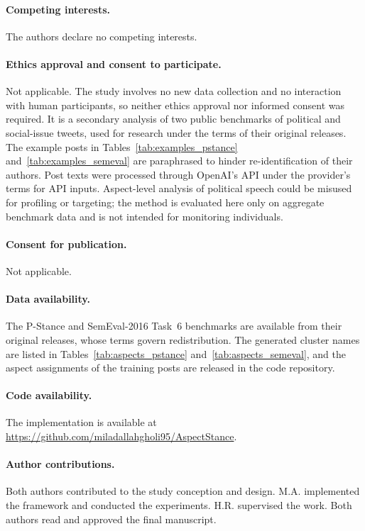 \documentclass[pdflatex,sn-mathphys-num,iicol]{sn-jnl}%
\begin{document}
\paragraph{Competing interests.} The authors declare no competing interests.

\paragraph{Ethics approval and consent to participate.} Not applicable. The study involves no new data collection and no interaction with human participants, so neither ethics approval nor informed consent was required. It is a secondary analysis of two public benchmarks of political and social-issue tweets, used for research under the terms of their original releases. The example posts in Tables~\ref{tab:examples_pstance} and~\ref{tab:examples_semeval} are paraphrased to hinder re-identification of their authors. Post texts were processed through OpenAI's API under the provider's terms for API inputs. Aspect-level analysis of political speech could be misused for profiling or targeting; the method is evaluated here only on aggregate benchmark data and is not intended for monitoring individuals.

\paragraph{Consent for publication.} Not applicable.

\paragraph{Data availability.} The P-Stance \cite{li2021p} and SemEval-2016 Task~6 \cite{mohammad2016semeval} benchmarks are available from their original releases, whose terms govern redistribution. The generated cluster names are listed in Tables~\ref{tab:aspects_pstance} and~\ref{tab:aspects_semeval}, and the aspect assignments of the training posts are released in the code repository.

\paragraph{Code availability.} The implementation is available at \url{https://github.com/miladallahgholi95/AspectStance}.

\paragraph{Author contributions.} Both authors contributed to the study conception and design. M.A. implemented the framework and conducted the experiments. H.R. supervised the work. Both authors read and approved the final manuscript.
\end{document}
